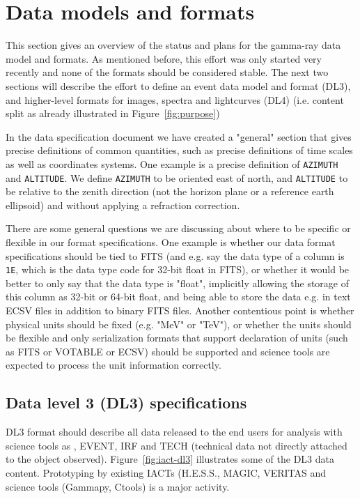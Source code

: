 \section{Data models and formats}

This section gives an overview of the status and plans for the gamma-ray data model and formats. As mentioned before, this effort was only started very recently and none of the formats should be considered stable. The next two sections will describe the effort to define an event data model and format (DL3), and higher-level formats for images, spectra and lightcurves (DL4) (i.e. content split as already illustrated in Figure~\ref{fig:purpose})

In the data specification document we have created a "general" section that gives precise definitions of common quantities, such as precise definitions of time scales as well as coordinates systems. One example is a precise definition of \texttt{AZIMUTH} and \texttt{ALTITUDE}. We define \texttt{AZIMUTH} to be oriented east of north, and \texttt{ALTITUDE} to be relative to the zenith direction (not the horizon plane or a reference earth ellipsoid) and without applying a refraction correction.

There are some general questions we are discussing about where to be specific or flexible in our format specifications. One example is whether our data format specifications should be tied to FITS (and e.g. say the data type of a column is \texttt{1E}, which is the data type code for 32-bit float in FITS), or whether it would be better to only say that the data type is "float", implicitly allowing the storage of this column as 32-bit or 64-bit float, and being able to store the data e.g. in text ECSV files in addition to binary FITS files. Another contentious point is whether physical units should be fixed (e.g. "MeV" or "TeV"), or whether the units should be flexible and only serialization formats that support declaration of units (such as FITS or VOTABLE or ECSV) should be supported and science tools are expected to process the unit information correctly.

\subsection{Data level 3 (DL3) specifications}

DL3 format should describe all data released to the end users for analysis with science tools as , EVENT, IRF and TECH (technical data not directly attached to the object observed). Figure~\ref{fig:iact-dl3} illustrates some of the DL3 data content. Prototyping by existing IACTs (H.E.S.S., MAGIC, VERITAS and science tools (Gammapy, Ctools) is a major activity. 

